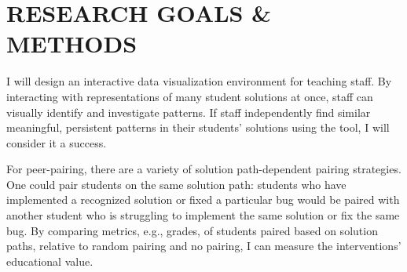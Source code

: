 \documentclass{sig-alternate-2013}
\begin{document}
\section{RESEARCH GOALS \& METHODS}

I will design an interactive data visualization environment for teaching staff. By interacting with representations of many student solutions at once, staff can visually identify and investigate patterns. If staff independently find similar meaningful, persistent patterns in their students' solutions using the tool, I will consider it a success.

For peer-pairing, there are a variety of solution path-dependent pairing strategies. One could pair students on the same solution path: students who have implemented a recognized solution or fixed a particular bug would be paired with another student who is struggling to implement the same solution or fix the same bug. By comparing metrics, e.g., grades, of students paired based on solution paths, relative to random pairing and no pairing, I can measure the interventions' educational value.


\end{document}
